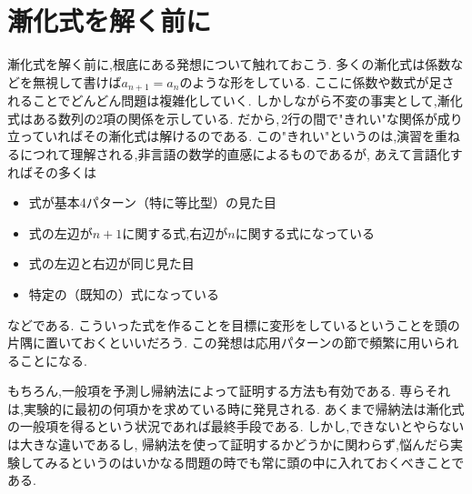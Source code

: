 
  \section{漸化式を解く前に}\label{sec:before}
    漸化式を解く前に,根底にある発想について触れておこう.
    多くの漸化式は係数などを無視して書けば$a_{n+1}=a_n$のような形をしている.
    ここに係数や数式が足されることでどんどん問題は複雑化していく.
    しかしながら不変の事実として,漸化式はある数列の2項の関係を示している.
    だから,\,2行の間で"きれい"な関係が成り立っていればその漸化式は解けるのである.
    この"きれい"というのは,演習を重ねるにつれて理解される,非言語の数学的直感によるものであるが,
    あえて言語化すればその多くは
    \begin{itemize}
      \item 式が基本4パターン（特に等比型）の見た目
      \item 式の左辺が$n+1$に関する式,右辺が$n$に関する式になっている
      \item 式の左辺と右辺が同じ見た目
      \item 特定の（既知の）式になっている
    \end{itemize}
    などである.
    こういった式を作ることを目標に変形をしているということを頭の片隅に置いておくといいだろう.
    この発想は応用パターンの節で頻繁に用いられることになる.

    もちろん,一般項を予測し帰納法によって証明する方法も有効である.
    専らそれは,実験的に最初の何項かを求めている時に発見される.
    あくまで帰納法は漸化式の一般項を得るという状況であれば最終手段である.
    しかし,できないとやらないは大きな違いであるし,
    帰納法を使って証明するかどうかに関わらず,悩んだら実験してみるというのはいかなる問題の時でも常に頭の中に入れておくべきことである.
